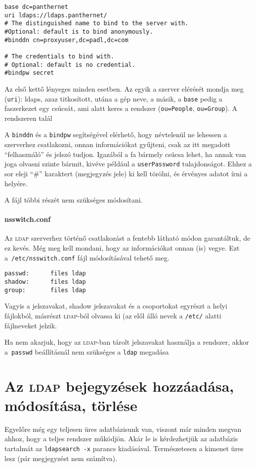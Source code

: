 \begin{Verbatim}[frame=single,label=/etc/ldap.conf részlet]
base dc=panthernet
uri ldaps://ldaps.panthernet/
# The distinguished name to bind to the server with.
#Optional: default is to bind anonymously.
#binddn cn=proxyuser,dc=padl,dc=com
  
# The credentials to bind with.
# Optional: default is no credential.
#bindpw secret
\end{Verbatim}

Az első kettő lényeges minden esetben. Az egyik a szerver elérését mondja meg (\texttt{uri}): ldaps, azaz titkosított,
utána a gép neve, a másik, a \texttt{base} pedig a faszerkezet egy csúcsát, ami alatt keres a rendszer
(\texttt{ou=People}, \texttt{ou=Group}). A rendszeren talál

A \texttt{binddn} és a \texttt{bindpw} segítségével elérhető, hogy névtelenül ne lehessen a szerverhez csatlakozni,
onnan információkat gyűjteni, csak az itt megadott ``felhasználó'' és jelszó tudjon. Igazából a fa bármely csúcsa
lehet, ha annak van joga olvasni szinte bármit, kivéve például a \texttt{userPassword} tulajdonságot. Ehhez a sor
eleji ``\#'' karaktert (megjegyzés jele) ki kell törölni, és érvényes adatot írni a helyére.

A fájl többi részét nem szükséges módosítani.


\paragraph{nsswitch.conf} Az \textsc{ldap} szerverhez történő csatlakozást a fentebb látható módon garantáltuk, de ez
kevés. Még meg kell mondani, hogy az információkat onnan (is) vegye. Ezt a~\texttt{/etc/nsswitch.conf} fájl
módosításával tehető meg.

\begin{Verbatim}[frame=single,label=/etc/nsswitch.conf \textsc{ldap}-ot használó része]
passwd:      files ldap
shadow:      files ldap
group:       files ldap
\end{Verbatim}

Vagyis a jelszavakat, shadow jelszavakat és a csoportokat egyrészt a helyi fájlokból, másrészt \textsc{ldap}-ból olvassa ki (az
elől álló nevek a \texttt{/etc/} alatti fájlneveket jelzik.

Ha nem akarjuk, hogy az \textsc{ldap}-ban tárolt jelszavakat használja a rendszer, akkor a~\texttt{passwd} beállításnál nem
szükséges a \texttt{ldap} megadása

\section{Az \textsc{ldap} bejegyzések hozzáadása, módosítása, törlése}
Egyelőre még egy teljesen üres adatbázisunk van, viszont már minden megvan ahhoz, hogy a teljes rendszer működjön. Akár
le is kérdezhetjük az adatbázis tartalmát az \texttt{ldapsearch -x} parancs kiadásával. Természetesen a kimenet üres
lesz (pár megjegyzést nem számítva).

